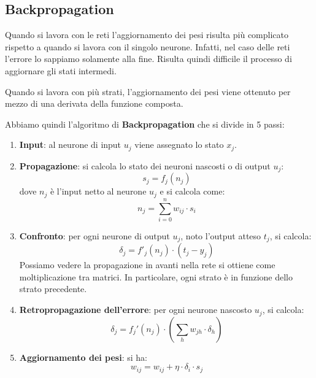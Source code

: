 \subsection{Backpropagation}
Quando si lavora con le reti l'aggiornamento dei pesi risulta più complicato
rispetto a quando si lavora con il singolo neurone. Infatti, nel caso delle reti
l'errore lo sappiamo solamente alla fine. Risulta quindi difficile il processo di
aggiornare gli stati intermedi.

Quando si lavora con più strati, l'aggiornamento dei pesi viene ottenuto per mezzo
di una derivata della funzione composta.

Abbiamo quindi l'algoritmo di \textbf{Backpropagation} che si divide in 5 passi:
\begin{enumerate}
    \item \textbf{Input}: al neurone di input $u_j$ viene assegnato lo stato $x_j$.
    \item \textbf{Propagazione}: si calcola lo stato dei neuroni nascosti o di output $u_j$:
          \begin{equation}
              s_j = f_j(n_j)
          \end{equation}
          dove $n_j$ è l'input netto al neurone $u_j$ e si calcola come:
          \begin{equation}
              n_j = \sum_{i = 0}^n w_{ij} \cdot s_i
          \end{equation}
    \item \textbf{Confronto}: per ogni neurone di output $u_j$, noto l'output
          atteso $t_j$, si calcola:
          \begin{equation}
              \delta_j = f'_j(n_j) \cdot (t_j - y_j)
          \end{equation}
          Possiamo vedere la propagazione in avanti nella rete si ottiene come
          moltiplicazione tra matrici. In particolare, ogni strato è in funzione
          dello strato precedente.
    \item \textbf{Retropropagazione dell'errore}: per ogni neurone nascosto $u_j$,
          si calcola:
          \begin{equation}
              \delta_j = f_j'(n_j) \cdot \left( \sum_{h} w_{jh} \cdot \delta_h \right)
          \end{equation}
    \item \textbf{Aggiornamento dei pesi}: si ha:
          \begin{equation}
              w_{ij} = w_{ij} + \eta \cdot \delta_i \cdot s_j
          \end{equation}
\end{enumerate}


